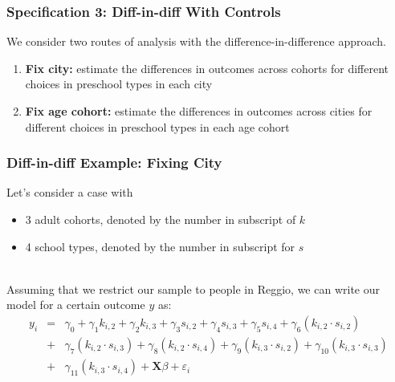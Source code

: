 \documentclass{beamer}
\begin{document}
\begin{frame} \frametitle{Specification 3: Diff-in-diff With Controls}

We consider two routes of analysis with the difference-in-difference approach.
\begin{enumerate}
\item \textbf{Fix city:} estimate the differences in outcomes across cohorts for different choices in preschool types in each city
\item \textbf{Fix age cohort:} estimate the differences in outcomes across cities for different choices in preschool types in each age cohort
\end{enumerate}

\end{frame}


\begin{frame} \frametitle{Diff-in-diff Example: Fixing City}

Let's consider a case with 
\begin{itemize}
\item 3 adult cohorts, denoted by the number in subscript of $k$
\item 4 school types, denoted by the number in subscript for $s$ \\\ 
\end{itemize}


Assuming that we restrict our sample to people in Reggio, we can write our model for a certain outcome $y$ as:
\begin{eqnarray}  \label{eq:specific2}
y_i & = & \gamma_0 + \gamma_1 k_{i,2} + \gamma_2 k_{i,3} + \gamma_3 s_{i,2} + \gamma_4 s_{i,3} + \gamma_5 s_{i,4} + \gamma_6 ({k_{i,2}}\cdot{s_{i,2}}) 
\nonumber \\ 
& + & \gamma_7 ({k_{i,2}}\cdot{s_{i,3}}) + \gamma_8 ({k_{i,2}}\cdot{s_{i,4}}) + \gamma_9 ({k_{i,3}}\cdot{s_{i,2}}) + \gamma_{10} ({k_{i,3}}\cdot{s_{i,3}})  \nonumber \\ 
& + &\gamma_{11} ({k_{i,3}}\cdot{s_{i,4}}) + \mathbf{X}\beta + \varepsilon_i  
\end{eqnarray}

\end{frame}
\end{document}
